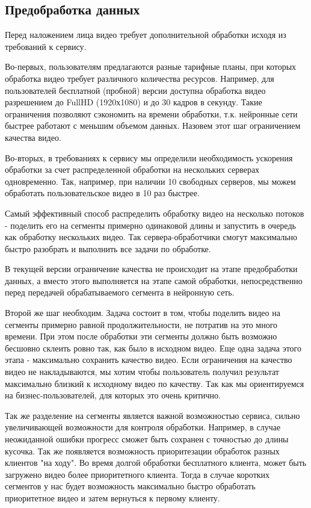 \subsection{Предобработка данных}

Перед наложением лица видео требует дополнительной обработки исходя из требований к сервису.

Во-первых, пользователям предлагаются разные тарифные планы, при которых обработка видео требует различного количества ресурсов. Например, для пользователей бесплатной (пробной) версии доступна обработка видео разрешением до FullHD (1920х1080) и до 30 кадров в секунду. Такие ограничения позволяют сэкономить на времени обработки, т.к. нейронные сети быстрее работают с меньшим объемом данных. Назовем этот шаг ограничением качества видео.

Во-вторых, в требованиях к сервису мы определили необходимость ускорения обработки за счет распределенной обработки на нескольких серверах одновременно. Так, например, при наличии 10 свободных серверов, мы можем обработать пользовательское видео в 10 раз быстрее.

Самый эффективный способ распределить обработку видео на несколько потоков - поделить его на сегменты примерно одинаковой длины и запустить в очередь как обработку нескольких видео. Так сервера-обработчики смогут максимально быстро разобрать и выполнить все задачи по обработке.

В текущей версии ограничение качества не происходит на этапе предобработки данных, а вместо этого выполняется на этапе самой обработки, непосредственно перед передачей обрабатываемого сегмента в нейронную сеть.

Второй же шаг необходим. Задача состоит в том, чтобы поделить видео на сегменты примерно равной продолжительности, не потратив на это много времени. При этом после обработки эти сегменты должно быть возможно бесшовно склеить ровно так, как было в исходном видео. Еще одна задача этого этапа - максимально сохранить качество видео. Если ограничения на качество видео не накладываются, мы хотим чтобы пользователь получил результат максимально близкий к исходному видео по качеству. Так как мы ориентируемся на бизнес-пользователей, для которых это очень критично.

Так же разделение на сегменты является важной возможностью сервиса, сильно увеличивающей возможности для контроля обработки. Например, в случае неожиданной ошибки прогресс сможет быть сохранен с точностью до длины кусочка. Так же появляется возможность приоритезации обработок разных клиентов "на ходу". Во время долгой обработки бесплатного клиента, может быть загружено видео более приоритетного клиента. Тогда в случае коротких сегментов у нас будет возможность максимально быстро обработать приоритетное видео и затем вернуться к первому клиенту.

